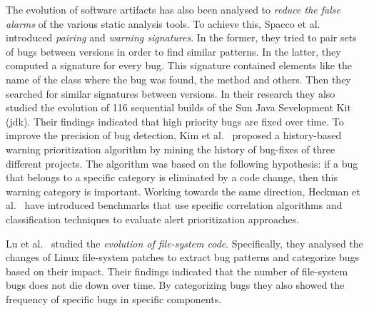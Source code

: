 \documentclass{sig-alternate}
\begin{document}
The evolution of software artifacts has also been analysed to {\it reduce the false
alarms} of the various static analysis tools. To achieve this, Spacco et
al.~\cite{SHP06} introduced {\it pairing} and {\it warning signatures}. In the
former, they tried to pair sets of bugs between versions in order to find
similar patterns. In the latter, they computed a signature for every bug. This
signature contained elements like the name of the class where the bug was found,
the method and others. Then they searched for similar signatures between
versions. In their research they also studied the evolution of 116 sequential
builds of the Sun Java Sevelopment Kit ({\sc jdk}). Their findings indicated that
high priority bugs are fixed over time. To improve the precision of bug
detection, Kim et al.~\cite{KE07b,KE07} proposed a history-based warning
prioritization algorithm by mining the history of bug-fixes of three
different projects. The algorithm was based on the following hypothesis: if a
bug that belongs to a specific category is eliminated by a code change, then
this warning category is important. Working towards the same direction, Heckman
et al.~\cite{HW09,HW08} have introduced benchmarks that use specific
correlation algorithms and classification techniques to evaluate alert
prioritization approaches.

Lu et al.~\cite{LAAL13} studied the {\it evolution of file-system code}.
Specifically, they analysed the changes of Linux file-system patches to extract
bug patterns and categorize bugs based on their impact. Their findings
indicated that the number of file-system bugs does not die down over time. By
categorizing bugs they also showed the frequency of specific bugs in specific
components.
\end{document}
